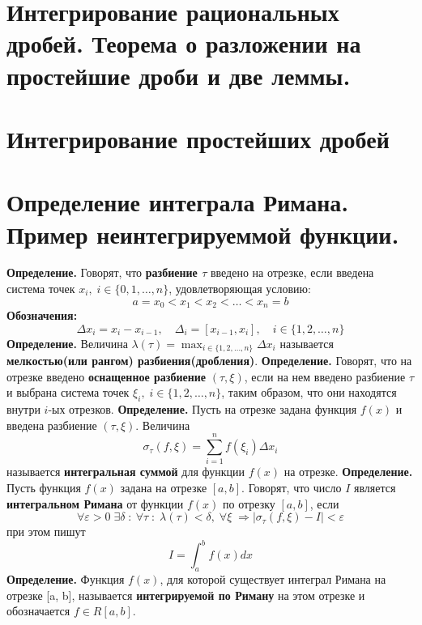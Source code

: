 \documentclass{article}
\newcommand*{\definition}[1]{\textbf{Определение.} #1 \newline}
\begin{document}
\section{Интегрирование рациональных дробей. Теорема о разложении на простейшие дроби и две леммы.}
\section{Интегрирование простейших дробей}
\section{Определение интеграла Римана. Пример неинтегрируеммой функции.}
\definition{ Говорят, что \textbf{разбиение $\tau$} введено на отрезке, если введена система точек $x_i, \; i \in \{0, 1, \dots, n\}$, удовлетворяющая условию: }
$$
    a = x_0 < x_1 < x_2 < \dots < x_n = b
$$
\textbf{Обозначения: }
$$
    \Delta x_i = x_i - x_{i-1}, \quad \Delta_i = [x_{i-1}, x_i], \quad i \in \{1, 2, \dots, n \}
$$
\definition{Величина $\lambda(\tau) = \displaystyle \max_{i \in \{1, 2, \dots, n \}} \Delta x_i$ называется \textbf{мелкостью(или рангом) разбиения(дробления)}.}
\newline
\definition{Говорят, что на отрезке введено \textbf{оснащенное разбиение} $(\tau, \xi)$, если на нем введено разбиение $\tau$ и выбрана система точек $\xi_i, \; i \in \{ 1, 2, \dots, n\}$, таким образом, что они находятся внутри $i$-ых отрезков.}
\newline
\definition{Пусть на отрезке задана функция $f(x)$ и введена разбиение $(\tau, \xi)$. Величина}
$$
    \sigma_\tau(f, \xi) = \sum_{i = 1}^{n} f(\xi_i) \Delta x_i
$$
называется \textbf{интегральная суммой} для функции $f(x)$ на отрезке.
\newline 
\newline 
\definition{Пусть функция $f(x)$ задана на отрезке $[a, b]$. Говорят, что число $I$ является \textbf{интегральном Римана} от функции $f(x)$ по отрезку $[a, b]$, если}
$$
    \forall \varepsilon > 0 \; \exists \delta \; : \: \forall \tau \; : \; \lambda(\tau) < \delta, \; \forall \xi \; \Rightarrow |\sigma_\tau(f, \xi) - I| < \varepsilon
$$
при этом пишут 
$$
    I = \int_{a}^{b} f(x)dx
$$
\definition{Функция $f(x)$, для которой существует интеграл Римана на отрезке [a, b], называется \textbf{интегрируемой по Риману} на этом отрезке и обозначается $f \in R[a, b]$.}
\newline 
\end{document}
